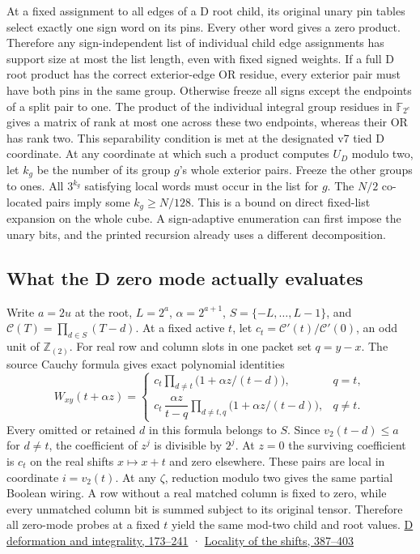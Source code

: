 \documentclass[11pt,a4paper]{article}
\begin{document}
At a fixed assignment to all edges of a D root child, its original unary
pin tables select exactly one sign word on its pins. Every other word
gives a zero product. Therefore any sign-independent list of individual
child edge assignments has support size at most the list length, even
with fixed signed weights. If a full D root product has the correct
exterior-edge OR residue, every exterior pair must have both pins in the
same group. Otherwise freeze all signs except the endpoints of a split
pair to one. The product of the individual integral group residues in
\(\mathbb F_{2^e}\) gives a matrix of rank at most one across these two
endpoints, whereas their OR has rank two. This separability condition is
met at the designated v7 tied D coordinate. At any coordinate at which
such a product computes \(U_D\) modulo two, let \(k_g\) be the number of
its group \(g\)'s whole exterior pairs. Freeze the other groups to ones.
All \(3^{k_g}\) satisfying local words must occur in the list for \(g\).
The \(N/2\) co-located pairs imply some \(k_g\ge N/128\). This is a
bound on direct fixed-list expansion on the whole cube. A sign-adaptive
enumeration can first impose the unary bits, and the printed recursion
already uses a different decomposition.

\subsection{What the D zero mode actually
evaluates}\label{v8-what-the-d-zero-mode-actually-evaluates}

Write \(a=2u\) at the root, \(L=2^a\), \(\alpha=2^{a+1}\),
\(S=\{-L,\ldots,L-1\}\), and \(\mathcal C(T)=\prod_{d\in S}(T-d)\). At a
fixed active \(t\), let \(c_t=\mathcal C'(t)/\mathcal C'(0)\), an odd
unit of \(\mathbb Z_{(2)}\). For real row and column slots in one packet
set \(q=y-x\). The source Cauchy formula gives exact polynomial
identities \[
 W_{xy}(t+\alpha z)=
 \begin{cases}
 c_t\displaystyle\prod_{d\ne t}\bigl(1+\alpha z/(t-d)\bigr),&q=t,\\[3pt]
 c_t\,\dfrac{\alpha z}{t-q}
    \displaystyle\prod_{d\ne t,q}\bigl(1+\alpha z/(t-d)\bigr),&q\ne t .
 \end{cases}
\tag{N7}
\] Every omitted or retained \(d\) in this formula belongs to \(S\).
Since \(v_2(t-d)\le a\) for \(d\ne t\), the coefficient of \(z^j\) is
divisible by \(2^j\). At \(z=0\) the surviving coefficient is \(c_t\) on
the real shifts \(x\mapsto x+t\) and zero elsewhere. These pairs are
local in coordinate \(i=v_2(t)\). At any \(\zeta\), reduction modulo two
gives the same partial Boolean wiring. A row without a real matched
column is fixed to zero, while every unmatched column bit is summed
subject to its original tensor. Therefore all zero-mode probes at a
fixed \(t\) yield the same mod-two child and root values.
\href{https://github.com/openai/math/blob/main/preprints/The-Exponential-Time-Hypothesis-is-False-October-25-2026/build/quantitative-contraction.tex\#L173}{D
deformation and integrality, 173--241} ·
\href{https://github.com/openai/math/blob/main/preprints/The-Exponential-Time-Hypothesis-is-False-October-25-2026/build/quantitative-contraction.tex\#L387}{Locality
of the shifts, 387--403}
\end{document}
